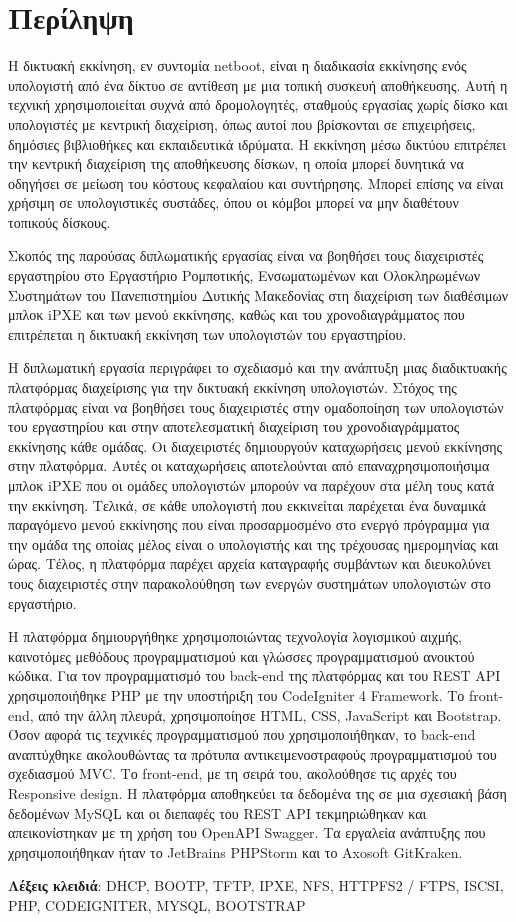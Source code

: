 \chapter*{Περίληψη}
Η δικτυακή εκκίνηση, εν συντομία netboot, είναι η διαδικασία εκκίνησης ενός υπολογιστή από ένα δίκτυο σε αντίθεση με μια τοπική συσκευή αποθήκευσης. Αυτή η τεχνική χρησιμοποιείται συχνά από δρομολογητές, σταθμούς εργασίας χωρίς δίσκο και υπολογιστές με κεντρική διαχείριση, όπως αυτοί που βρίσκονται σε επιχειρήσεις, δημόσιες βιβλιοθήκες και εκπαιδευτικά ιδρύματα. Η εκκίνηση μέσω δικτύου επιτρέπει την κεντρική διαχείριση της αποθήκευσης δίσκων, η οποία μπορεί δυνητικά να οδηγήσει σε μείωση του κόστους κεφαλαίου και συντήρησης. Μπορεί επίσης να είναι χρήσιμη σε υπολογιστικές συστάδες, όπου οι κόμβοι μπορεί να μην διαθέτουν τοπικούς δίσκους.

Σκοπός της παρούσας διπλωματικής εργασίας είναι να βοηθήσει τους διαχειριστές εργαστηρίου στο Εργαστήριο Ρομποτικής, Ενσωματωμένων και Ολοκληρωμένων Συστημάτων του Πανεπιστημίου Δυτικής Μακεδονίας στη διαχείριση των διαθέσιμων μπλοκ iPXE και των μενού εκκίνησης, καθώς και του χρονοδιαγράμματος που επιτρέπεται η δικτυακή εκκίνηση των υπολογιστών του εργαστηρίου.

Η διπλωματική εργασία περιγράφει το σχεδιασμό και την ανάπτυξη μιας διαδικτυακής πλατφόρμας διαχείρισης για την δικτυακή εκκίνηση υπολογιστών. Στόχος της πλατφόρμας είναι να βοηθήσει τους διαχειριστές στην ομαδοποίηση των υπολογιστών του εργαστηρίου και στην αποτελεσματική διαχείριση του χρονοδιαγράμματος εκκίνησης κάθε ομάδας. Οι διαχειριστές δημιουργούν καταχωρήσεις μενού εκκίνησης στην πλατφόρμα. Αυτές οι καταχωρήσεις αποτελούνται από επαναχρησιμοποιήσιμα μπλοκ iPXE που οι ομάδες υπολογιστών μπορούν να παρέχουν στα μέλη τους κατά την εκκίνηση. Τελικά, σε κάθε υπολογιστή που εκκινείται παρέχεται ένα δυναμικά παραγόμενο μενού εκκίνησης που είναι προσαρμοσμένο στο ενεργό πρόγραμμα για την ομάδα της οποίας μέλος είναι ο υπολογιστής και της τρέχουσας ημερομηνίας και ώρας. Τέλος, η πλατφόρμα παρέχει αρχεία καταγραφής συμβάντων και διευκολύνει τους διαχειριστές στην παρακολούθηση των ενεργών συστημάτων υπολογιστών στο εργαστήριο.

Η πλατφόρμα δημιουργήθηκε χρησιμοποιώντας τεχνολογία λογισμικού αιχμής, καινοτόμες μεθόδους προγραμματισμού και γλώσσες προγραμματισμού ανοικτού κώδικα. Για τον προγραμματισμό του back-end της πλατφόρμας και του REST API χρησιμοποιήθηκε PHP με την υποστήριξη του CodeIgniter 4 Framework. Το front-end, από την άλλη πλευρά, χρησιμοποίησε HTML, CSS, JavaScript και Bootstrap. Όσον αφορά τις τεχνικές προγραμματισμού που χρησιμοποιήθηκαν, το back-end αναπτύχθηκε ακολουθώντας τα πρότυπα αντικειμενοστραφούς προγραμματισμού του σχεδιασμού MVC. Το front-end, με τη σειρά του, ακολούθησε τις αρχές του Responsive design. Η πλατφόρμα αποθηκεύει τα δεδομένα της σε μια σχεσιακή βάση δεδομένων MySQL και οι διεπαφές του REST API τεκμηριώθηκαν και απεικονίστηκαν με τη χρήση του OpenAPI Swagger. Τα εργαλεία ανάπτυξης που χρησιμοποιήθηκαν ήταν το JetBrains PHPStorm και το Axosoft GitKraken.

\vfill
\textbf{Λέξεις κλειδιά}: DHCP, BOOTP, TFTP, IPXE, NFS, HTTPFS2 / FTPS, ISCSI, PHP, CODEIGNITER, MYSQL, BOOTSTRAP